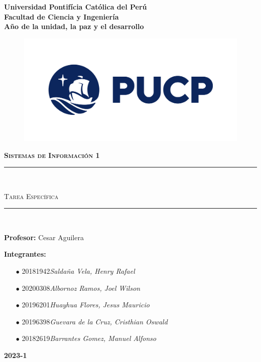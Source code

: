 \begin{titlepage}
	\begin{center}
		{\Huge \textbf{Universidad Pontifícia Católica del Perú}}\\
		\vspace{3mm}
		{\Huge \textbf{Facultad de Ciencia y Ingeniería }}\\
		\vspace{1cm}
    {\Huge\textbf{Año de la unidad, la paz y el desarrollo}}\\
    \vspace{1cm}
		\begin{figure}[h]
			\centering
			\includegraphics[width=15cm]{cover/logo_PUCP.png}
		\end{figure}
		\vspace{5mm}
		{\LARGE \textbf{\textsc{Sistemas de Información 1}}}
		\vspace{2mm}
		\textcolor{PUCP}{\rule{\linewidth}{0.75mm}}\\
		\begin{spacing}{1}
			\LARGE\textsc{Tarea Específica}
		\end{spacing}
		\textcolor{PUCP}{\rule{\linewidth}{0.75mm}}\\
		
		\vspace{0.5cm}
		\begin{flushleft}
			{\Large\textbf{Profesor: } Cesar Aguilera}
			\vspace{2mm}
			
			{\Large\textbf{Integrantes:}}
			\begin{itemize}\Large
				\item[$ \bullet $] 20181942\dotfill\textsl{Saldaña Vela, Henry Rafael}
				\item[$ \bullet $] 20200308\dotfill\textsl{Albornoz Ramos, Joel Wilson}
				\item[$ \bullet $] 20196201\dotfill\textsl{Huayhua Flores, Jesus Mauricio}
				\item[$ \bullet $] 20196398\dotfill\textsl{Guevara de la Cruz, Cristhian Oswald}
				\item[$ \bullet $] 20182619\dotfill\textsl{Barrantes Gomez, Manuel Alfonso}
			\end{itemize}
		\end{flushleft}
		\vfill
		{\Huge \textbf{2023-1}}
	\end{center}
\end{titlepage}